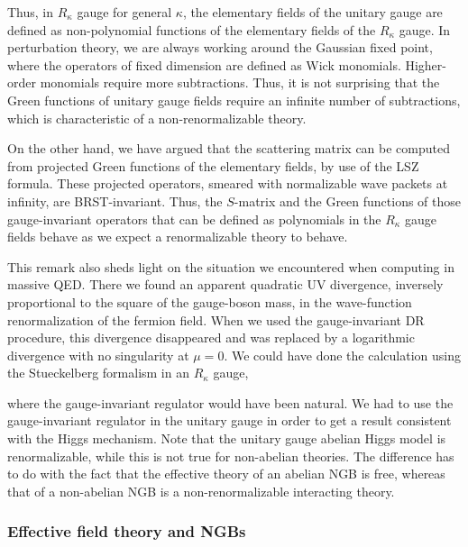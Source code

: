 Thus, in $R_\kappa$ gauge for general $\kappa$, the elementary fields of the
unitary gauge are defined as non-polynomial functions of the elementary fields
of the $R_\kappa$ gauge. In perturbation theory, we are always working around
the Gaussian fixed point, where the operators of fixed dimension are defined as
Wick monomials. Higher-order monomials require more subtractions. Thus, it is
not surprising that the Green functions of unitary gauge fields require an
infinite number of subtractions, which is characteristic of a non-renormalizable
theory.

On the other hand, we have argued that the scattering matrix can be computed
from projected Green functions of the elementary fields, by use of the LSZ
formula. These projected operators, smeared with normalizable wave packets at
infinity, are BRST-invariant. Thus, the $S$-matrix and the Green functions of
those gauge-invariant operators that can be defined as polynomials in the
$R_\kappa$ gauge fields behave as we expect a renormalizable theory to behave.

This remark also sheds light on the situation we encountered when computing in
massive QED. There we found an apparent quadratic UV divergence, inversely
proportional to the square of the gauge-boson mass, in the wave-function
renormalization of the fermion field. When we used the gauge-invariant DR
procedure, this divergence disappeared and was replaced by a logarithmic
divergence with no singularity at $\mu=0$. We could have done the calculation
using the Stueckelberg formalism in an $R_\kappa$ gauge,

where the gauge-invariant regulator would have been natural. We had to use the
gauge-invariant regulator in the unitary gauge in order to get a result
consistent with the Higgs mechanism. Note that the unitary gauge abelian Higgs
model is renormalizable, while this is not true for non-abelian theories. The
difference has to do with the fact that the effective theory of an abelian NGB
is free, whereas that of a non-abelian NGB is a non-renormalizable interacting
theory.

\subsubsection{Effective field theory and NGBs}

